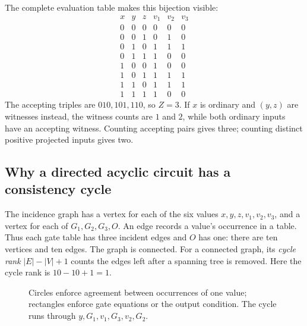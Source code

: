 The complete evaluation table makes this bijection visible:
\[
\begin{array}{ccc|ccc}
 x&y&z&v_1&v_2&v_3\\ \hline
 0&0&0&0&0&0\\
 0&0&1&0&1&0\\
 0&1&0&1&1&1\\
 0&1&1&1&0&0\\
 1&0&0&1&0&0\\
 1&0&1&1&1&1\\
 1&1&0&1&1&1\\
 1&1&1&1&0&0
\end{array}
\]
The accepting triples are $010,101,110$, so $Z=3$. If $x$ is ordinary
and $(y,z)$ are witnesses instead, the witness counts are $1$ and $2$,
while both ordinary inputs have an accepting witness. Counting accepting
pairs gives three; counting distinct positive projected inputs gives two.

\subsection{Why a directed acyclic circuit has a consistency cycle}

The incidence graph has a vertex for each of the six values
$x,y,z,v_1,v_2,v_3$, and a vertex for each of $G_1,G_2,G_3,O$.
An edge records a value's occurrence in a table. Thus each gate table has
three incident edges and $O$ has one: there are ten vertices and ten edges.
The graph is connected. For a connected graph, its \emph{cycle rank}
$|E|-|V|+1$ counts the edges left after a spanning tree is removed.
Here the cycle rank is $10-10+1=1$.

\begin{figure}[htbp]
\centering
{}
\caption{Circles enforce agreement between occurrences of one value;
rectangles enforce gate equations or the output condition. The cycle runs
through $y,G_1,v_1,G_3,v_2,G_2$.}
\label{fig:walk-incidence}
\end{figure}

